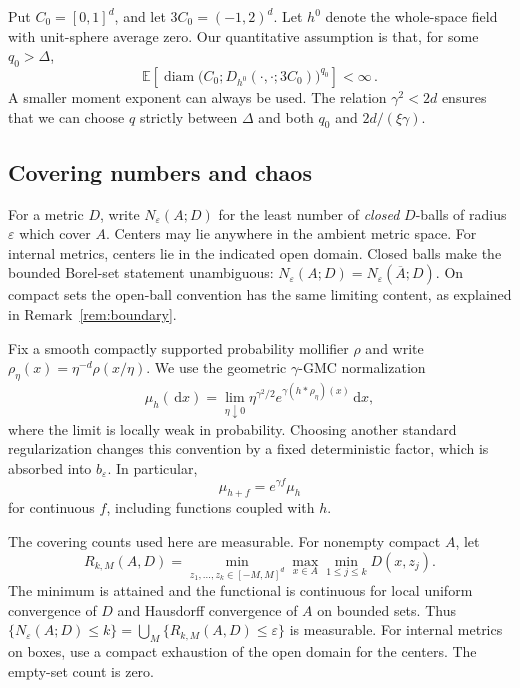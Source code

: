 \documentclass[11pt,letterpaper]{article}
\newcommand{\E}{\mathbb E}
\newcommand{\eps}{\varepsilon}
\newcommand{\dd}{\,\mathrm d}
\DeclareMathOperator{\diam}{diam}
\theoremstyle{definition}
\theoremstyle{remark}
\numberwithin{equation}{section}
\begin{document}
Put $C_0=[0,1]^d$, and let $3C_0=(-1,2)^d$. Let $h^0$ denote the whole-space field with unit-sphere average zero. Our quantitative assumption is that, for some $q_0>\Delta$,
\begin{equation}\label{eq:single-moment}
 \E\!\left[\diam\bigl(C_0;D_{h^0}(\cdot,\cdot;3C_0)\bigr)^{q_0}\right]<\infty\,.
\end{equation}
A smaller moment exponent can always be used. The relation $\gamma^2<2d$ ensures that we can choose $q$ strictly between $\Delta$ and both $q_0$ and $2d/(\xi\gamma)$.

\subsection{Covering numbers and chaos}

For a metric $D$, write $N_\eps(A;D)$ for the least number of
\emph{closed} $D$-balls of radius $\eps$ which cover $A$. Centers may lie
anywhere in the ambient metric space. For internal metrics, centers lie in the indicated open domain. Closed balls make the bounded Borel-set statement unambiguous: $N_\eps(A;D)=N_\eps(\overline A;D)$. On compact sets the open-ball convention has the same limiting content, as explained in Remark~\ref{rem:boundary}.

Fix a smooth compactly supported probability mollifier $\rho$ and write $\rho_\eta(x)=\eta^{-d}\rho(x/\eta)$. We use the geometric $\gamma$-GMC normalization
\begin{equation}\label{eq:geometric-gmc}
 \mu_h(\dd x)
 =\lim_{\eta\downarrow0}
       \eta^{\gamma^2/2}e^{\gamma(h*\rho_\eta)(x)}\dd x,
\end{equation}
where the limit is locally weak in probability. Choosing another standard regularization changes this convention by a fixed deterministic factor, which is absorbed into $b_\eps$. In particular,
\begin{equation}\label{eq:gmc-weyl}
 \mu_{h+f}=e^{\gamma f}\mu_h
\end{equation}
for continuous $f$, including functions coupled with $h$.

The covering counts used here are measurable. For nonempty compact $A$, let
\begin{equation*}
 R_{k,M}(A,D)=\min_{z_1,\ldots,z_k\in[-M,M]^d}
                   \max_{x\in A}\min_{1\le j\le k}D(x,z_j).
\end{equation*}
The minimum is attained and the functional is continuous for local uniform convergence of $D$ and Hausdorff convergence of $A$ on bounded sets. Thus $\{N_\eps(A;D)\le k\}=\bigcup_M\{R_{k,M}(A,D)\le\eps\}$ is measurable. For internal metrics on boxes, use a compact exhaustion of the open domain for the centers. The empty-set count is zero.
\end{document}
